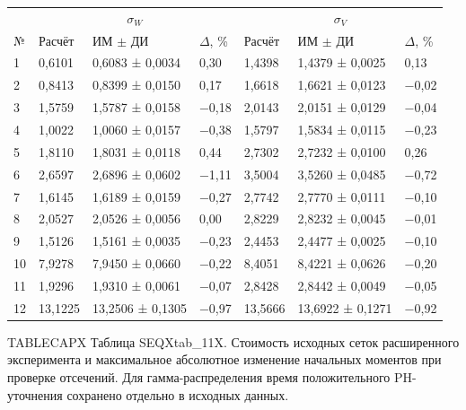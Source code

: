 \setlength{\tabcolsep}{2pt}
\begin{tabular}{p{1.5cm}p{1.9cm}p{3.4cm}p{1.4cm}p{1.9cm}p{3.4cm}p{1.4cm}}
\toprule
 & \multicolumn{3}{c}{$\sigma_W$} & \multicolumn{3}{c}{$\sigma_V$} \\
№ & Расчёт & ИМ $\pm$ ДИ & $\Delta$, \% & Расчёт & ИМ $\pm$ ДИ & $\Delta$, \% \\
\midrule
1 & 0,6101 & 0,6083 ± 0,0034 & 0,30 & 1,4398 & 1,4379 ± 0,0025 & 0,13 \\
2 & 0,8413 & 0,8399 ± 0,0150 & 0,17 & 1,6618 & 1,6621 ± 0,0123 & −0,02 \\
3 & 1,5759 & 1,5787 ± 0,0158 & −0,18 & 2,0143 & 2,0151 ± 0,0129 & −0,04 \\
4 & 1,0022 & 1,0060 ± 0,0157 & −0,38 & 1,5797 & 1,5834 ± 0,0115 & −0,23 \\
5 & 1,8110 & 1,8031 ± 0,0118 & 0,44 & 2,7302 & 2,7232 ± 0,0100 & 0,26 \\
6 & 2,6597 & 2,6896 ± 0,0602 & −1,11 & 3,5004 & 3,5260 ± 0,0485 & −0,72 \\
7 & 1,6145 & 1,6189 ± 0,0159 & −0,27 & 2,7742 & 2,7770 ± 0,0111 & −0,10 \\
8 & 2,0527 & 2,0526 ± 0,0056 & 0,00 & 2,8229 & 2,8232 ± 0,0045 & −0,01 \\
9 & 1,5126 & 1,5161 ± 0,0035 & −0,23 & 2,4453 & 2,4477 ± 0,0025 & −0,10 \\
10 & 7,9278 & 7,9450 ± 0,0660 & −0,22 & 8,4051 & 8,4221 ± 0,0626 & −0,20 \\
11 & 1,9296 & 1,9310 ± 0,0061 & −0,07 & 2,8428 & 2,8442 ± 0,0049 & −0,05 \\
12 & 13,1225 & 13,2506 ± 0,1305 & −0,97 & 13,5666 & 13,6922 ± 0,1271 & −0,92 \\
\bottomrule
\end{tabular}




\noindent TABLECAPX Таблица SEQXtab_11X. Стоимость исходных сеток расширенного эксперимента и максимальное абсолютное изменение начальных моментов при проверке отсечений. Для гамма-распределения время положительного PH-уточнения сохранено отдельно в исходных данных.\par

